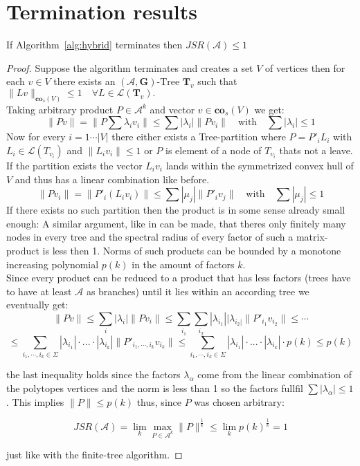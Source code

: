\section{Termination results}

\begin{theorem}{}\label{thm:hybrid-found}
If Algorithm~\ref{alg:hybrid} terminates then $JSR(\mathcal{A}) \leq 1$
\end{theorem}

\begin{proof}
Suppose the algorithm terminates and creates a set $V$ of vertices then for each $v \in V$ there exists an $(\mathcal{A},\mathbf{G})\text{-Tree } \mathbf{T}_{v}$ such that $\lVert Lv \rVert_{\mathbf{co}_s (V)} \leq 1 \quad \forall L \in \mathcal{L}(\mathbf{T}_{v}).$ \\
Taking arbitrary product $P \in \mathcal{A}^k$ and vector $v \in \mathbf{co}_s(V)$
we get:
$$\lVert Pv \rVert = \lVert P \sum \lambda_i v_i \rVert \leq \sum |\lambda_i| \lVert P v_i \rVert \quad \text{with} \quad \sum |\lambda_i| \leq 1$$
Now for every $i = 1 \cdots \lvert V \rvert$ there either exists a Tree-partition where $P = P'_i L_i $ with $L_i \in \mathcal{L}(T_{v_i})$ and $\lVert L_i v_i \rVert \leq 1$ or $P$ is element of a node of $T_{v_i}$ thats not a leave. If the partition exists the vector $L_iv_i$ lands within the symmetrized convex hull of $V$ and thus has a linear combination like before. \\
$$ \lVert P v_i \rVert = \lVert P'_i (L_i v_i) \rVert \leq \sum |\mu_j| \lVert P'_i v_j \rVert \quad \text{with} \quad \sum |\mu_j| \leq 1 $$
If there exists no such partition then the product is in some sense already small enough: A similar argument, like in \citep{mollerTreebasedApproachJoint2014} can be made, that theres only finitely many nodes in every tree and the spectral radius of every factor of such a matrix-product is less then 1. Norms of such products can be bounded by a monotone increasing polynomial $p(k)$ in the amount of factors $k$. \\
Since every product can be reduced to a product that has less factors (trees have to have at least $\mathcal{A}$ as branches) until it lies within an according tree we eventually get:
$$ \lVert Pv \rVert \leq \sum \limits_{i} |\lambda_i| \lVert P v_i \rVert \leq \sum\limits_{i_1}\sum\limits_{i_2}|\lambda_{i_1}||\lambda_{i_2|} \lVert P'_{i_1} v_{i_2} \rVert \leq \cdots $$
$$  \leq \sum \limits_{i_1,\cdots,i_k \in \Sigma} |\lambda_{i_1}| \cdot...\cdot |\lambda_{i_k}| \lVert P'_{i_1,\cdots,i_k}v_{i_k} \rVert \leq \sum \limits_{i_1,\cdots,i_k \in \Sigma} |\lambda_{i_1}|\cdot...\cdot|\lambda_{i_k}| \cdot p(k) \leq p(k)$$

the last inequality holds since the factors $\lambda_{\alpha}$ come from the linear combination of the polytopes vertices and the norm is less than 1 so the factors fullfil $\sum |\lambda_{\alpha}| \leq 1$. This implies $\lVert P \rVert \leq p(k)$ thus, since $P$ was chosen arbitrary:

$$JSR(\mathcal{A}) = \lim_k \max_{P \in \mathcal{A}^k} \lVert P \rVert ^{\frac{1}{k}} \leq \lim_k p(k) ^{\frac{1}{k}}  = 1$$

just like with the finite-tree algorithm.
\end{proof}

